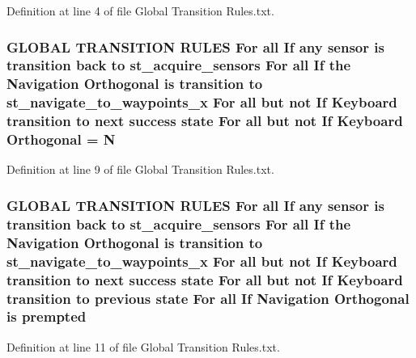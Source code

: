 Definition at line 4 of file Global Transition Rules.\+txt.

\subsubsection[{\texorpdfstring{Orthogonal}{Orthogonal}}]{\setlength{\rightskip}{0pt plus 5cm}G\+L\+O\+B\+AL T\+R\+A\+N\+S\+I\+T\+I\+ON R\+U\+L\+ES For all If any sensor is transition back to st\+\_\+acquire\+\_\+sensors For all If the Navigation Orthogonal is transition to st\+\_\+navigate\+\_\+to\+\_\+waypoints\+\_\+x For all but not If Keyboard transition to next success state For all but not If Keyboard Orthogonal = N}\hypertarget{3_2docs_2Global_01Transition_01Rules_8txt_a2e1cdec29dad5013e514270d0a78fe22}{}\label{3_2docs_2Global_01Transition_01Rules_8txt_a2e1cdec29dad5013e514270d0a78fe22}


Definition at line 9 of file Global Transition Rules.\+txt.

\subsubsection[{\texorpdfstring{prempted}{prempted}}]{\setlength{\rightskip}{0pt plus 5cm}G\+L\+O\+B\+AL T\+R\+A\+N\+S\+I\+T\+I\+ON R\+U\+L\+ES For all If any sensor is transition back to st\+\_\+acquire\+\_\+sensors For all If the Navigation {\bf Orthogonal} is transition to st\+\_\+navigate\+\_\+to\+\_\+waypoints\+\_\+x For all but not If Keyboard transition to next success state For all but not If Keyboard transition to previous state For all If Navigation {\bf Orthogonal} is prempted}\hypertarget{3_2docs_2Global_01Transition_01Rules_8txt_ac6583c64beac40f27e253c605d5d5b5b}{}\label{3_2docs_2Global_01Transition_01Rules_8txt_ac6583c64beac40f27e253c605d5d5b5b}


Definition at line 11 of file Global Transition Rules.\+txt.

